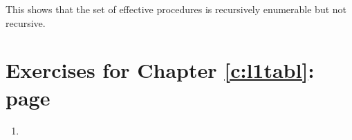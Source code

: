 {\begin{enumerate}
\begin{enumerate}
\begin{enumerate}
This shows that the set of effective procedures is recursively enumerable but not recursive.

	\end{enumerate}
\end{enumerate}
\end{enumerate}

}

\section*{Exercises for Chapter \ref{c:l1tabl}: page \pageref{ex6}} \label{ans6}

{\small
\begin{enumerate}
\item ~{\qobitree
}


\end{enumerate}}

